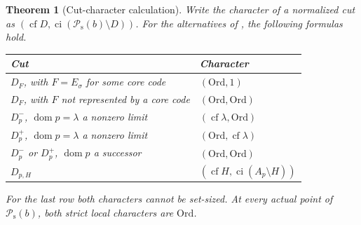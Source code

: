 \documentclass[11pt]{article}
\newtheorem{theorem}{Theorem}[section]
\theoremstyle{definition}
\theoremstyle{remark}
\newcommand{\Ord}{\mathrm{Ord}}
\newcommand{\Psupp}{\mathcal P_{\mathrm{s}}}
\newcommand{\dom}{\operatorname{dom}}
\newcommand{\cf}{\operatorname{cf}}
\newcommand{\ci}{\operatorname{ci}}
\begin{document}
\begin{theorem}[Cut-character calculation]\label{swo:tc:thm:characters}
Write the character of a normalized cut as
$(\cf D,\ci(\Psupp(b)\setminus D))$. For the alternatives of
, the following formulas hold.
\begin{center}
\begin{tabularx}{\textwidth}{@{}Yl@{}}
\toprule
Cut & Character\\\midrule
$D_F$, with $F=E_\sigma$ for some core code & $(\Ord,1)$\\
$D_F$, with $F$ not represented by a core code & $(\Ord,\Ord)$\\
$D_p^-$, $\dom p=\lambda$ a nonzero limit & $(\cf\lambda,\Ord)$\\
$D_p^+$, $\dom p=\lambda$ a nonzero limit & $(\Ord,\cf\lambda)$\\
$D_p^-$ or $D_p^+$, $\dom p$ a successor & $(\Ord,\Ord)$\\
$D_{p,H}$ & $(\cf H,\ci(A_p\setminus H))$\\
\bottomrule
\end{tabularx}
\end{center}
For the last row both characters cannot be set-sized. At every actual
point of $\Psupp(b)$, both \emph{strict} local characters are $\Ord$.
\end{theorem}
\end{document}

